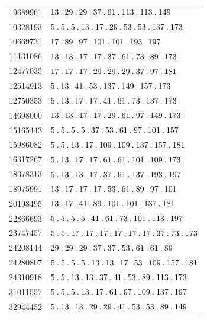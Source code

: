 \begin{longtable}{@{}r|l@{}}
9689961 & $13\pdot 29\pdot 29\pdot 37\pdot 61\pdot 113\pdot 113\pdot 149$\\
10328193 & $5\pdot 5\pdot 5\pdot 13\pdot 17\pdot 29\pdot 53\pdot 53\pdot 137\pdot 173$\\
10669731 & $17\pdot 89\pdot 97\pdot 101\pdot 101\pdot 193\pdot 197$\\
11131086 & $13\pdot 13\pdot 17\pdot 17\pdot 37\pdot 61\pdot 73\pdot 89\pdot 173$\\
12477035 & $17\pdot 17\pdot 17\pdot 29\pdot 29\pdot 29\pdot 37\pdot 97\pdot 181$\\
12514913 & $5\pdot 13\pdot 41\pdot 53\pdot 137\pdot 149\pdot 157\pdot 173$\\
12750353 & $5\pdot 13\pdot 17\pdot 17\pdot 41\pdot 61\pdot 73\pdot 137\pdot 173$\\
14698000 & $13\pdot 13\pdot 17\pdot 17\pdot 29\pdot 61\pdot 97\pdot 149\pdot 173$\\
15165443 & $5\pdot 5\pdot 5\pdot 5\pdot 37\pdot 53\pdot 61\pdot 97\pdot 101\pdot 157$\\
15986082 & $5\pdot 5\pdot 13\pdot 17\pdot 109\pdot 109\pdot 137\pdot 157\pdot 181$\\
16317267 & $5\pdot 13\pdot 17\pdot 17\pdot 61\pdot 61\pdot 101\pdot 109\pdot 173$\\
18378313 & $5\pdot 13\pdot 13\pdot 17\pdot 37\pdot 61\pdot 137\pdot 193\pdot 197$\\
18975991 & $13\pdot 17\pdot 17\pdot 17\pdot 53\pdot 61\pdot 89\pdot 97\pdot 101$\\
20198495 & $13\pdot 17\pdot 41\pdot 89\pdot 101\pdot 101\pdot 137\pdot 181$\\
22866693 & $5\pdot 5\pdot 5\pdot 5\pdot 41\pdot 61\pdot 73\pdot 101\pdot 113\pdot 197$\\
23747457 & $5\pdot 5\pdot 17\pdot 17\pdot 17\pdot 17\pdot 17\pdot 17\pdot 37\pdot 73\pdot 173$\\
24208144 & $29\pdot 29\pdot 29\pdot 37\pdot 37\pdot 53\pdot 61\pdot 61\pdot 89$\\
24280807 & $5\pdot 5\pdot 5\pdot 5\pdot 13\pdot 13\pdot 17\pdot 53\pdot 109\pdot 157\pdot 181$\\
24310918 & $5\pdot 5\pdot 13\pdot 13\pdot 37\pdot 41\pdot 53\pdot 89\pdot 113\pdot 173$\\
31011557 & $5\pdot 5\pdot 5\pdot 13\pdot 17\pdot 61\pdot 97\pdot 109\pdot 137\pdot 197$\\
32944452 & $5\pdot 13\pdot 13\pdot 29\pdot 29\pdot 41\pdot 53\pdot 53\pdot 89\pdot 149$\\

\end{longtable}
